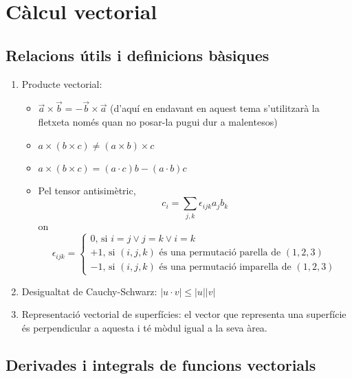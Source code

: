 \chapter{Càlcul vectorial}

\section{Relacions útils i definicions bàsiques}

\begin{enumerate}
	\item Producte vectorial:
	\begin{itemize}
		\item $\vec{a}\times\vec{b}=-\vec{b}\times\vec{a}$ (d'aquí en endavant en aquest tema s'utilitzarà la fletxeta només quan no posar-la pugui dur a malentesos)
		\item $a\times(b\times c)\neq (a\times b)\times c$
		\item $a\times(b\times c)=(a\cdot c)b-(a\cdot b)c$
		\item Pel tensor antisimètric,
		\[
		c_i=\sum_{j,k}\epsilon_{ijk}a_jb_k
		\]
		on \[
		\epsilon_{ijk}=\begin{cases}
			0\text{, si }i=j\vee j=k\vee i=k\\
			+1\text{, si }(i,j,k)\text{ és una permutació parella de }(1,2,3)\\
			-1\text{, si }(i,j,k)\text{ és una permutació imparella de }(1,2,3)
			\end{cases}
		\]
	\end{itemize}
	\item Desigualtat de Cauchy-Schwarz: $|u\cdot v|\leq |u||v|$
	\item Representació vectorial de superfícies: el vector que representa una superfície és perpendicular a aquesta i té mòdul igual a la seva àrea.
\end{enumerate}

\section{Derivades i integrals de funcions vectorials}

